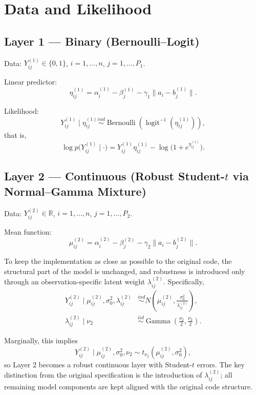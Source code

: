 \documentclass[11pt]{article}
\begin{document}
\section{Data and Likelihood}

\subsection{Layer 1 --- Binary (Bernoulli--Logit)}

Data: $Y_{ij}^{(1)} \in \{0,1\}$, $i=1,\dots,n$, $j=1,\dots,P_1$.

Linear predictor:
\[
\eta_{ij}^{(1)} = \alpha_i^{(1)} - \beta_j^{(1)} - \gamma_1\|a_i - b_j^{(1)}\|.
\]

Likelihood:
\[
Y_{ij}^{(1)} \mid \eta_{ij}^{(1)} \overset{ind}{\sim} \operatorname{Bernoulli}\!\left(\operatorname{logit}^{-1}(\eta_{ij}^{(1)})\right),
\]
that is,
\[
\log p\bigl(Y_{ij}^{(1)}\mid \cdot\bigr) = Y_{ij}^{(1)}\eta_{ij}^{(1)} - \log\bigl(1+e^{\eta_{ij}^{(1)}}\bigr).
\]

\subsection{Layer 2 --- Continuous (Robust Student-$t$ via Normal--Gamma Mixture)}

Data: $Y_{ij}^{(2)} \in \mathbb{R}$, $i=1,\dots,n$, $j=1,\dots,P_2$.

Mean function:
\[
\mu_{ij}^{(2)} = \alpha_i^{(2)} - \beta_j^{(2)} - \gamma_2\|a_i - b_j^{(2)}\|.
\]

To keep the implementation as close as possible to the original code, the structural part of the model is unchanged, and robustness is introduced only through an observation-specific latent weight $\lambda_{ij}^{(2)}$. Specifically,
\begin{align*}
Y_{ij}^{(2)} \mid \mu_{ij}^{(2)}, \sigma_0^2, \lambda_{ij}^{(2)}
&\overset{ind}{\sim}
N\!\left(\mu_{ij}^{(2)}, \frac{\sigma_0^2}{\lambda_{ij}^{(2)}}\right),\\
\lambda_{ij}^{(2)} \mid \nu_2
&\overset{iid}{\sim}
\operatorname{Gamma}\!\left(\frac{\nu_2}{2},\frac{\nu_2}{2}\right).
\end{align*}

Marginally, this implies
\[
Y_{ij}^{(2)} \mid \mu_{ij}^{(2)},\sigma_0^2,\nu_2
\sim t_{\nu_2}\!\left(\mu_{ij}^{(2)},\sigma_0^2\right),
\]
so Layer 2 becomes a robust continuous layer with Student-$t$ errors. The key distinction from the original specification is the introduction of $\lambda_{ij}^{(2)}$; all remaining model components are kept aligned with the original code structure.
\end{document}
